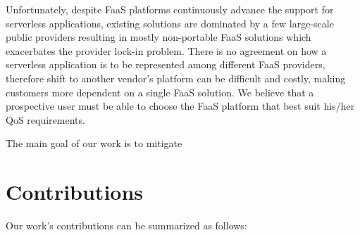 \documentclass[12pt,a4paper]{report}
\begin{document}
Unfortunately, despite FaaS platforms continuously advance the support for serverless applications, existing solutions are dominated by a few large-scale public providers resulting in mostly non-portable FaaS solutions which exacerbates the provider lock-in problem. There is no agreement on how a serverless application is to be represented among different FaaS providers, therefore shift to another vendor's platform can be difficult and costly, making customers more dependent on a single FaaS solution. We believe that a prospective user must be able to choose the FaaS platform that best suit his/her QoS requirements.

The main goal of our work is to mitigate 



\section{Contributions}

Our work's contributions can be summarized as follows:
\end{document}
